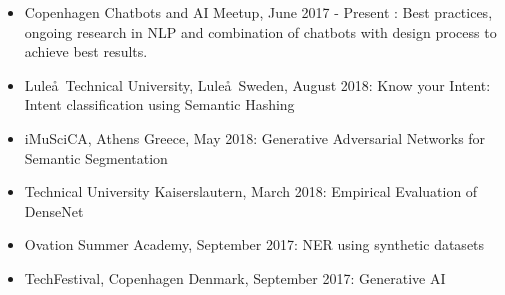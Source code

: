 \documentclass[10pt,letterpaper]{article}
\begin{document}
\begin{itemize}
	\parskip=0.1em
	
	\item {\color{BrickRed} Copenhagen Chatbots and AI Meetup}, June 2017 - Present : Best practices, ongoing research in NLP and combination of chatbots with design process to achieve best results.
	
	\item {\color{BrickRed} Lule\aa\ Technical University}, Lule\aa\ Sweden, August 2018: Know your Intent: Intent classification using Semantic Hashing
	
	\item {\color{BrickRed} iMuSciCA}, Athens Greece, May 2018: Generative Adversarial Networks for Semantic Segmentation 
	\item {\color{BrickRed} Technical University Kaiserslautern}, March 2018: Empirical Evaluation of DenseNet 
		
	\item {\color{BrickRed} Ovation Summer Academy}, September 2017: NER using synthetic datasets 
	
	\item {\color{BrickRed} TechFestival}, Copenhagen Denmark, September 2017: Generative AI 
	
\end{itemize}
\end{document}
